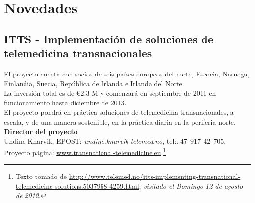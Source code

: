 \documentclass[xcolor=svgnames]{beamer}
\begin{document}
\section{Novedades}
\subsection[ITTS]{ITTS - Implementación de soluciones de telemedicina transnacionales}
\begin{frame}
   El proyecto cuenta con socios de seis países europeos del norte, Escocia, Noruega, Finlandia, Suecia, República de Irlanda e Irlanda del Norte.\\ \pause
   La inversión total es de \euro $2.3$ M y comenzará en septiembre de 2011 en funcionamiento hasta diciembre de $2013$.\\ \pause
   El proyecto pondrá en práctica soluciones de telemedicina transnacionales, a escala, y de una manera sostenible, en la práctica diaria en la periferia norte.\\ \pause
   \textbf{Director del proyecto}\\ 
   Undine Knarvik, EPOST: \textit{undine.knarvik \@ telemed.no}, tel:. $47\ \ 917\ \ 42\ \ 705$.\\
   Proyecto página: \url{www.transnational-telemedicine.eu}.\footnote{Texto tomado de \url{http://www.telemed.no/itts-implementing-transnational-telemedicine-solutions.5037968-4259.html}, \textit{visitado el Domingo 12 de agosto de 2012}.}
\end{frame}
\end{document}
